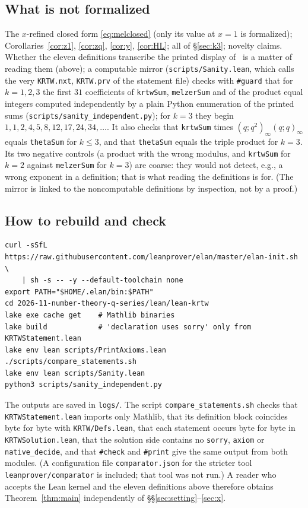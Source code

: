 \documentclass[11pt]{amsart}
\theoremstyle{definition}
\numberwithin{equation}{section}
\newcommand{\fpath}[1]{\nolinkurl{#1}}
\begin{document}
\subsection{What is not formalized}
The $x$-refined closed form \eqref{eq:melclosed} (only its value at $x=1$ is formalized);
Corollaries~\ref{cor:z1}, \ref{cor:zq}, \ref{cor:y}, \ref{cor:HL}; all of §\ref{sec:k3}; novelty
claims. Whether the eleven definitions transcribe the printed display of~\cite{KRTW} is a matter of
reading them (above); a computable mirror (\fpath{scripts/Sanity.lean}, which calls the very
\texttt{KRTW.nxt}, \texttt{KRTW.prv} of the statement file) checks with \texttt{\#guard} that for
$k=1,2,3$ the first $31$ coefficients of \texttt{krtwSum}, \texttt{melzerSum} and of the product equal
integers computed independently by a plain Python enumeration of the printed sums
(\fpath{scripts/sanity_independent.py}); for $k=3$ they begin $1,1,2,4,5,8,12,17,24,34,\dots$. It also
checks that \texttt{krtwSum} times $(q;q^2)_\infty(q;q)_\infty$ equals \texttt{thetaSum} for $k\le3$, and that
\texttt{thetaSum} equals the triple product for $k=3$. Its two negative controls (a product with the wrong
modulus, and \texttt{krtwSum} for $k=2$ against \texttt{melzerSum} for $k=3$) are coarse: they would not
detect, e.g., a wrong exponent in a definition; that is what reading the definitions is for. (The mirror is linked to the noncomputable definitions by
inspection, not by a proof.)

\subsection{How to rebuild and check}
{\footnotesize
\begin{verbatim}
curl -sSfL https://raw.githubusercontent.com/leanprover/elan/master/elan-init.sh \
    | sh -s -- -y --default-toolchain none
export PATH="$HOME/.elan/bin:$PATH"
cd 2026-11-number-theory-q-series/lean/lean-krtw
lake exe cache get    # Mathlib binaries
lake build            # 'declaration uses sorry' only from KRTWStatement.lean
lake env lean scripts/PrintAxioms.lean
./scripts/compare_statements.sh
lake env lean scripts/Sanity.lean
python3 scripts/sanity_independent.py
\end{verbatim}}
The outputs are saved in \fpath{logs/}. The script \fpath{compare_statements.sh} checks that
\fpath{KRTWStatement.lean} imports only Mathlib, that its definition block coincides byte for byte with
\fpath{KRTW/Defs.lean}, that each statement occurs byte for byte in \fpath{KRTWSolution.lean}, that the
solution side contains no \texttt{sorry}, \texttt{axiom} or \texttt{native\_decide}, and that
\texttt{\#check} and \texttt{\#print} give the same output from both modules. (A configuration file
\fpath{comparator.json} for the stricter tool \texttt{leanprover/comparator} is included; that tool was not
run.) A reader who accepts the Lean kernel and the eleven definitions above therefore obtains
Theorem~\ref{thm:main} independently of §§\ref{sec:setting}--\ref{sec:x}.
\end{document}
